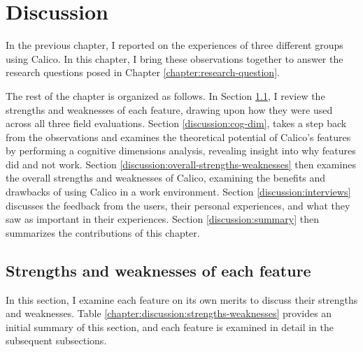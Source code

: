 \chapter{Discussion}
\label{chapter:discussion}

In the previous chapter, I reported on the experiences of three different groups using Calico. In this chapter, I bring these observations together to answer the research questions posed in Chapter \ref{chapter:research-question}.

The rest of the chapter is organized as follows. In Section \ref{discussion:strengths-and-weaknesses}, I review the strengths and weaknesses of each feature, drawing upon how they were used across all three field evaluations. Section \ref{discussion:cog-dim}, takes a step back from the observations and examines the theoretical potential of Calico's features by performing a cognitive dimensions analysis, revealing insight into why features did and not work. Section \ref{discussion:overall-strengths-weaknesses} then examines the overall strengths and weaknesses of Calico, examining the benefits and drawbacks of using Calico in a work environment. Section \ref{discussion:interviews} discusses the feedback from the users, their personal experiences, and what they saw as important in their experiences. Section \ref{discussion:summary} then summarizes the contributions of this chapter.

\section{Strengths and weaknesses of each feature}
\label{discussion:strengths-and-weaknesses}

In this section, I examine each feature on its own merits to discuss their strengths and weaknesses. Table \ref{chapter:discussion:strengths-weaknesses} provides an initial summary of this section, and each feature is examined in detail in the subsequent subsections.


